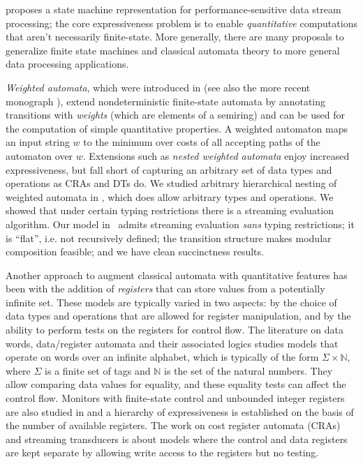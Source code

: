  proposes a state machine representation for performance-sensitive data stream processing;
the core expressiveness problem is to enable \emph{quantitative} computations that aren't necessarily finite-state.
More generally, there are many proposals to generalize finite state machines and classical automata theory to more general data processing applications.

\emph{Weighted automata}, which were introduced in \cite{S1961WA} (see also the more recent monograph \cite{DKV2009HWA}), extend nondeterministic finite-state automata by annotating transitions with \emph{weights} (which are elements of a semiring) and can be used for the computation of simple quantitative properties. A weighted automaton maps an input string $w$ to the minimum over costs of all accepting paths of the automaton over $w$.
Extensions such as \emph{nested weighted automata} \cite{CHO2015NWA} enjoy increased expressiveness, but fall short of capturing an arbitrary set of data types and operations as CRAs and DTs do. We studied arbitrary hierarchical nesting of weighted automata in , which does allow arbitrary types and operations. We showed that under certain typing restrictions there is a streaming evaluation algorithm.
Our model in~ admits streaming evaluation \emph{sans} typing restrictions; it is ``flat'', i.e. not recursively defined; the transition structure makes modular composition feasible; and we have clean succinctness results.

Another approach to augment classical automata with quantitative features has been with the addition of \emph{registers} that can store values from a potentially infinite set. These models are typically varied in two aspects: by the choice of data types and operations that are allowed for register manipulation, and by the ability to perform tests on the registers for control flow.
The literature on data words, data/register automata and their associated logics \cite{KF1994FMA, NSV2004FSM, DL2009LFQ, BS2010NRDL, BDMSS2011LDW} studies models that operate on words over an infinite alphabet, which is typically of the form $\Sigma \times \mathbb{N}$, where $\Sigma$ is a finite set of tags and $\mathbb{N}$ is the set of the natural numbers. They allow comparing data values for equality, and these equality tests can affect the control flow.
Monitors with finite-state control and unbounded integer registers are also studied in \cite{FHS2018} and a hierarchy of expressiveness is established on the basis of the number of available registers.
The work on cost register automata (CRAs) \cite{AdADRY2013CRA, AR2013ARF} and streaming transducers \cite{AC2010SST, AC2011STA, AdA2012STT} is about models where the control and data registers are kept separate by allowing write access to the registers but no testing.

